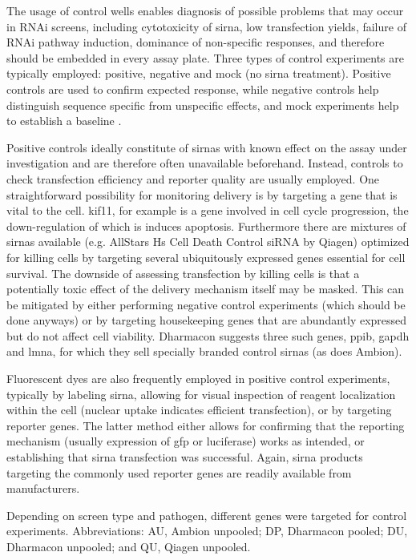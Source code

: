 The usage of control wells enables diagnosis of possible problems that may occur in RNAi screens, including cytotoxicity of \gls{sirna}, low transfection yields, failure of RNAi pathway induction, dominance of non-specific responses, and therefore should be embedded in every assay plate. Three types of control experiments are typically employed: positive, negative and mock (no \gls{sirna} treatment). Positive controls are used to confirm expected response, while negative controls help distinguish sequence specific from unspecific effects, and mock experiments help to establish a baseline \citep{Sittampalam2004}.

Positive controls ideally constitute of \glspl{sirna} with known effect on the assay under investigation and are therefore often unavailable beforehand. Instead, controls to check transfection efficiency and reporter quality are usually employed. One straightforward possibility for monitoring delivery is by targeting a gene that is vital to the cell. \Gls{kif11}, for example is a gene involved in cell cycle progression, the down-regulation of which is induces apoptosis. Furthermore there are mixtures of \glspl{sirna} available (e.g. AllStars Hs Cell Death Control siRNA by Qiagen) optimized for killing cells by targeting several ubiquitously expressed genes essential for cell survival. The downside of assessing transfection by killing cells is that a potentially toxic effect of the delivery mechanism itself may be masked. This can be mitigated by either performing negative control experiments (which should be done anyways) or by targeting housekeeping genes that are abundantly expressed but do not affect cell viability. Dharmacon suggests three such genes, \gls{ppib}, \gls{gapdh} and \gls{lmna}, for which they sell specially branded control \glspl{sirna} (as does Ambion).

Fluorescent dyes are also frequently employed in positive control experiments, typically by labeling \gls{sirna}, allowing for visual inspection of reagent localization within the cell (nuclear uptake indicates efficient transfection), or by targeting reporter genes. The latter method either allows for confirming that the reporting mechanism (usually expression of \gls{gfp} or luciferase) works as intended, or establishing that \gls{sirna} transfection was successful. Again, \gls{sirna} products targeting the commonly used reporter genes are readily available from manufacturers.

\renewcommand{\arraystretch}{1.1}
\setlength{\tabcolsep}{0.14em}
\begin{table}
\begin{minipage}{\textwidth}
  \centering
  \caption[Control experiments used in the different screens.]{Depending on screen type and pathogen, different genes were targeted for control experiments. Abbreviations: AU, Ambion unpooled; DP, Dharmacon pooled; DU, Dharmacon unpooled; and QU, Qiagen unpooled.}
  \label{tab:infectx-control}
  \footnotesize
  
\end{minipage}
\end{table}

